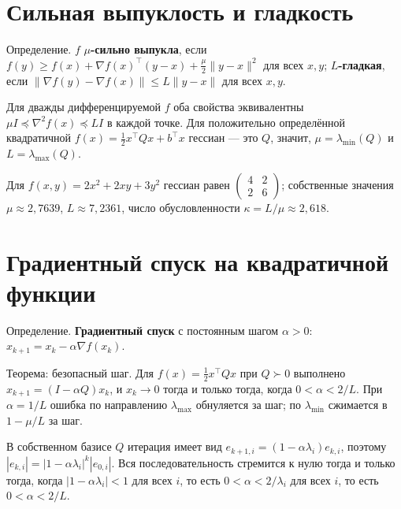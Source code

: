\documentclass[11pt,a4paper]{article}
\begin{document}
\section{Сильная выпуклость и гладкость}\label{sec:strongL}

\begin{definitionbox}{Определение.}
$f$ \textbf{$\mu$-сильно выпукла}, если $f(y)\ge f(x)+\nabla f(x)^\top(y-x)+\tfrac{\mu}{2}\|y-x\|^2$ для всех $x,y$; \textbf{$L$-гладкая}, если $\|\nabla f(y)-\nabla f(x)\|\le L\|y-x\|$ для всех $x,y$.
\end{definitionbox}

Для дважды дифференцируемой $f$ оба свойства эквивалентны $\mu I\preceq\nabla^2 f(x)\preceq L I$ в каждой точке. Для положительно определённой квадратичной $f(x)=\tfrac{1}{2}x^\top Qx+b^\top x$ гессиан — это $Q$, значит, $\mu=\lambda_{\min}(Q)$ и $L=\lambda_{\max}(Q)$.

\begin{examplebox}
Для $f(x,y)=2x^2+2xy+3y^2$ гессиан равен $\begin{pmatrix}4&2\\2&6\end{pmatrix}$; собственные значения $\mu\approx 2{,}7639$, $L\approx 7{,}2361$, число обусловленности $\kappa=L/\mu\approx 2{,}618$.
\end{examplebox}

\section{Градиентный спуск на квадратичной функции}\label{sec:gd}

\begin{definitionbox}{Определение.}
\textbf{Градиентный спуск} с постоянным шагом $\alpha>0$: $x_{k+1}=x_k-\alpha\nabla f(x_k)$.
\end{definitionbox}

\begin{theorembox}{Теорема: безопасный шаг.}
Для $f(x)=\tfrac{1}{2}x^\top Qx$ при $Q\succ0$ выполнено $x_{k+1}=(I-\alpha Q)x_k$, и $x_k\to0$ тогда и только тогда, когда $0<\alpha<2/L$. При $\alpha=1/L$ ошибка по направлению $\lambda_{\max}$ обнуляется за шаг; по $\lambda_{\min}$ сжимается в $1-\mu/L$ за шаг.
\end{theorembox}

\begin{proofbox}
В собственном базисе $Q$ итерация имеет вид $e_{k+1,i}=(1-\alpha\lambda_i)e_{k,i}$, поэтому $|e_{k,i}|=|1-\alpha\lambda_i|^k|e_{0,i}|$. Вся последовательность стремится к нулю тогда и только тогда, когда $|1-\alpha\lambda_i|<1$ для всех $i$, то есть $0<\alpha<2/\lambda_i$ для всех $i$, то есть $0<\alpha<2/L$.
\end{proofbox}
\end{document}
